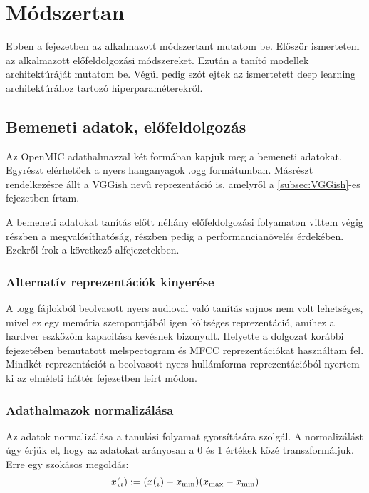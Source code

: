 \chapter{Módszertan} 
\label{ch:methodology}

Ebben a fejezetben az alkalmazott módszertant mutatom be. Először ismertetem az alkalmazott előfeldolgozási módszereket. Ezután a tanító modellek architektúráját mutatom be. Végül pedig szót ejtek az ismertetett deep learning architektúrához tartozó hiperparaméterekről.

\section{Bemeneti adatok, előfeldolgozás}

Az OpenMIC adathalmazzal két formában kapjuk meg a bemeneti adatokat. Egyrészt elérhetőek a nyers hanganyagok .ogg formátumban. Másrészt rendelkezésre állt a VGGish nevű reprezentáció is, amelyről a \ref{subsec:VGGish}-es fejezetben írtam.

A bemeneti adatokat tanítás előtt néhány előfeldolgozási folyamaton vittem végig részben a megvalósíthatóság, részben pedig a performancianövelés érdekében. Ezekről írok a következő alfejezetekben.

\subsection{Alternatív reprezentációk kinyerése}

A .ogg fájlokból beolvasott nyers audioval való tanítás sajnos nem volt lehetséges, mivel ez egy memória szempontjából igen költséges reprezentáció, amihez a hardver eszközöm kapacitása kevésnek bizonyult. Helyette a dolgozat korábbi fejezetében bemutatott melspectogram és MFCC reprezentációkat használtam fel. Mindkét reprezentációt a beolvasott nyers hullámforma reprezentációból nyertem ki az elméleti háttér fejezetben leírt módon.

\subsection{Adathalmazok normalizálása}

Az adatok normalizálása a tanulási folyamat gyorsítására szolgál. A normalizálást úgy érjük el, hogy az adatokat arányosan a 0 és 1 értékek közé transzformáljuk. Erre egy szokásos megoldás:
\begin{equation}
x(_i) := (x(_i) - x_{\text{min}}) \/ (x_{\text{max}} - x_{\text{min}})
\end{equation}

